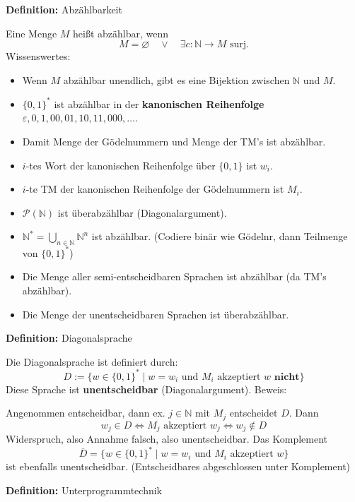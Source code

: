 \documentclass[a4paper,graphics,11pt]{article}
\newcommand{\eps}[0]{\varepsilon}
\begin{document}
\textbf{Definition:} Abzählbarkeit

Eine Menge $M$ heißt abzählbar, wenn
$$
    M = \varnothing\quad \lor\quad \exists c : \mathbb{N} \to M \text{ surj.}
$$
Wissenswertes:
\begin{itemize}
    \item Wenn $M$ abzählbar unendlich, gibt es eine Bijektion zwischen $\mathbb{N}$ und $M$.
    \item $\{0,1\}^*$ ist abzählbar in der \textbf{kanonischen Reihenfolge}
        $\eps, 0,1, 00, 01, 10, 11, 000, \dots$.
    \item Damit Menge der Gödelnummern und Menge der TM's ist abzählbar.
    \\
    \item $i$-tes Wort der kanonischen Reihenfolge über $\{0,1\}$ ist $w_i$.
    \item $i$-te TM der kanonischen Reihenfolge der Gödelnummern ist $M_i$.
    \\
    \item $\mathcal{P}(\mathbb{N})$ ist überabzählbar (Diagonalargument).
    \item $\mathbb{N}^* = \bigcup_{n \in \mathbb{N}}\mathbb{N}^n$ ist abzählbar. (Codiere binär
        wie Gödelnr, dann Teilmenge von $\{0,1\}^*$)
    \item Die Menge aller semi-entscheidbaren Sprachen ist abzählbar (da TM's abzählbar).
    \item Die Menge der unentscheidbaren Sprachen ist überabzählbar.
\end{itemize}

\newpage

\textbf{Definition:} Diagonalsprache

Die Diagonalsprache ist definiert durch:
$$
    D := \{w \in \{0,1\}^* \mid w = w_i \text{ und } M_i \text{ akzeptiert } w \textbf{ nicht}\}
$$
Diese Sprache ist \textbf{unentscheidbar} (Diagonalargument). Beweis:

Angenommen entscheidbar, dann ex. $j \in \mathbb{N}$ mit $M_j$ entscheidet $D$. Dann
$$
    w_j \in D \iff M_j \text{ akzeptiert } w_j \iff w_j \notin D
$$
Widerspruch, also Annahme falsch, also unentscheidbar. Das Komplement
$$
    \overline{D} = \{w \in \{0,1\}^* \mid w = w_i \text{ und } M_i \text{ akzeptiert } w\}
$$
ist ebenfalls unentscheidbar. (Entscheidbares abgeschlossen unter Komplement)

\strut

\textbf{Definition:} Unterprogrammtechnik
\end{document}
